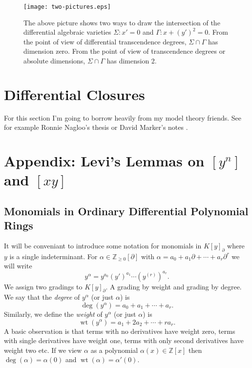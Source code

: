 \documentclass[12pt]{book}
\numberwithin{equation}{section}
\theoremstyle{definition}
\theoremstyle{remark}
\newcommand{\ZZ}{\mathbb{Z}}
\newcommand{\wt}{\operatorname{wt}}
\begin{document}
\begin{figure}[h]
	\begin{center}
		\texttt{[image: two-pictures.eps]}
	\end{center}
	\caption{The above picture shows two ways to draw the intersection of the differential algebraic varieties $\Sigma \colon x'=0$ and $\Gamma \colon x+(y')^2=0$. 
		From the point of view of differential transcendence degrees, $\Sigma \cap \Gamma$ has dimension zero. 
		From the point of view of transcendence degrees or absolute dimensions, $\Sigma\cap \Gamma$ has dimension 2.
	}\label{F:two-pictures}
\end{figure}


\section{Differential Closures}\label{S:univariate-differential-closures}
For this section I'm going to borrow heavily from my model theory friends.
See for example Ronnie Nagloo's thesis or David Marker's notes \cite{Marker2000}.


\section{Appendix: Levi's Lemmas on $[y^n]$ and $[xy]$}\label{S:levi}

\subsection{Monomials in Ordinary Differential Polynomial Rings}
It will be conveniant to introduce some notation for monomials in $K[ y ]_{\partial}$ where $y$ is a single indeterminant. 
For $\alpha \in \ZZ_{\geq 0}[\partial]$ with $\alpha = a_0 + a_1 \partial + \cdots + a_r \partial^r$ we will write 
$$ y^{\alpha} = y^{a_0} (y')^{a_1} \cdots (y^{(r)})^{a_r}.$$
We assign two gradings to $K[y]_{\partial}$. 
A grading by weight and grading by degree. 
We say that the \emph{degree} of $y^{\alpha}$ (or just $\alpha$) is 
$$\deg(y^{\alpha}) = a_0 + a_1 + \cdots + a_r.$$
Similarly, we define the \emph{weight} of $y^{\alpha}$ (or just $\alpha$) is 
$$ \wt(y^{\alpha}) = a_1 + 2a_2 + \cdots + r a_r.$$
A basic observation is that terms with no derivatives have weight zero, terms with single derivatives have weight one, terms with only second derivatives have weight two etc. 
If we view $\alpha$ as a polynomial $\alpha(x) \in \ZZ[x]$ then $\deg(\alpha) = \alpha(0)$ and $\wt(\alpha) = \alpha'(0)$. 
\end{document}
